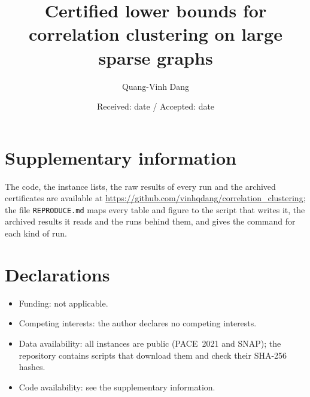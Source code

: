 \documentclass[smallextended,envcountsame]{svjour3}
\begin{document}
\title{Certified lower bounds for correlation clustering on large sparse
graphs}

\author{Quang-Vinh Dang}

\date{Received: date / Accepted: date}

\maketitle

\begin{abstract}

\end{abstract}









\section*{Supplementary information}  The code, the instance lists, the raw
results of every run and the archived certificates are available at
\url{https://github.com/vinhqdang/correlation_clustering}; the file
\texttt{REPRODUCE.md} maps every table and figure to the script that writes
it, the archived results it reads and the runs behind them, and gives the
command for each kind of run.

\section*{Declarations}

\begin{itemize}
\item Funding: not applicable.
\item Competing interests: the author declares no competing interests.
\item Data availability: all instances are public (PACE~2021 and SNAP); the
repository contains scripts that download them and check their SHA-256
hashes.
\item Code availability: see the supplementary information.
\end{itemize}

\appendix




\end{document}
